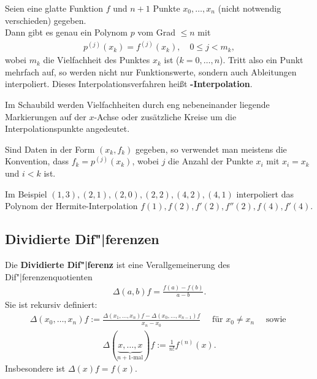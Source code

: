 Seien eine glatte Funktion $f$ und $n + 1$ Punkte $x_0, \dotsc, x_n$
(nicht notwendig verschieden) gegeben. \\
Dann gibt es genau ein Polynom $p$ vom Grad $\le n$ mit
\begin{align*}
    p^{(j)}(x_k) = f^{(j)}(x_k), \quad
    0 \le j < m_k,
\end{align*}
wobei $m_k$ die Vielfachheit des Punktes $x_k$ ist ($k = 0, \dotsc, n$).
Tritt also ein Punkt mehrfach auf, so werden nicht nur Funktionswerte, sondern
auch Ableitungen interpoliert.
Dieses Interpolationsverfahren heißt \textbf{-Interpolation}.

Im Schaubild werden Vielfachheiten durch eng nebeneinander liegende
Markierungen auf der $x$-Achse oder zusätzliche Kreise um die
Interpolationspunkte angedeutet.

\linie

Sind Daten in der Form $(x_k, f_k)$ gegeben, so verwendet man
meistens die Konvention, dass $f_k = p^{(j)}(x_k)$, wobei $j$ die Anzahl der
Punkte $x_i$ mit $x_i = x_k$ und $i < k$ ist.

Im Beispiel $(1, 3), (2, 1), (2, 0), (2, 2), (4, 2), (4, 1)$ interpoliert
das Polynom der Hermite-Inter\-polation
$f(1), f(2), f'(2), f''(2), f(4), f'(4)$.

\pagebreak

\subsection{%
    Dividierte Dif"|ferenzen%
}

Die \textbf{Dividierte Dif"|ferenz} ist eine Verallgemeinerung des
Dif"|ferenzenquotienten
\begin{align*}
    \Delta(a, b)f = \frac{f(a) - f(b)}{a - b}.
\end{align*}
Sie ist rekursiv definiert:
\begin{align*}
    \Delta(x_0, \dotsc, x_n)f
    := \frac{\Delta(x_1, \dotsc, x_n)f -
    \Delta(x_0, \dotsc, x_{n-1})f}{x_n - x_0}
    \quad\text{ für } x_0 \not= x_n \quad\text{ sowie }
\end{align*}
\begin{align*}
    \Delta(\underbrace{x, \dotsc, x}_{n + 1 \text{-mal}})f
    := \frac{1}{n!} f^{(n)}(x).
\end{align*}
Insbesondere ist $\Delta(x)f = f(x)$.

\linie

